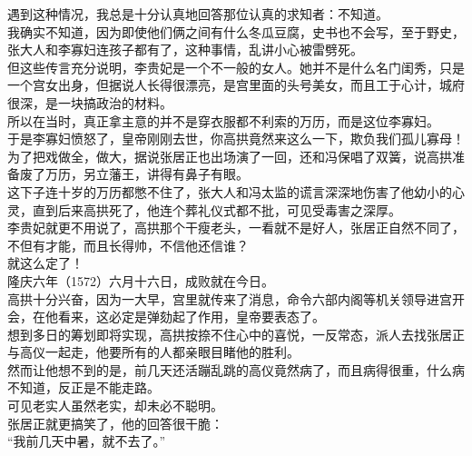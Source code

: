 \begin{multicols}{\theparacolNo}
遇到这种情况，我总是十分认真地回答那位认真的求知者：不知道。\\

我确实不知道，因为即使他们俩之间有什么冬瓜豆腐，史书也不会写，至于野史，张大人和李寡妇连孩子都有了，这种事情，乱讲小心被雷劈死。\\

但这些传言充分说明，李贵妃是一个不一般的女人。她并不是什么名门闺秀，只是一个宫女出身，但据说人长得很漂亮，是宫里面的头号美女，而且工于心计，城府很深，是一块搞政治的材料。\\

所以在当时，真正拿主意的并不是穿衣服都不利索的万历，而是这位李寡妇。\\

于是李寡妇愤怒了，皇帝刚刚去世，你高拱竟然来这么一下，欺负我们孤儿寡母！\\

为了把戏做全，做大，据说张居正也出场演了一回，还和冯保唱了双簧，说高拱准备废了万历，另立藩王，讲得有鼻子有眼。\\

这下子连十岁的万历都憋不住了，张大人和冯太监的谎言深深地伤害了他幼小的心灵，直到后来高拱死了，他连个葬礼仪式都不批，可见受毒害之深厚。\\

李贵妃就更不用说了，高拱那个干瘦老头，一看就不是好人，张居正自然不同了，不但有才能，而且长得帅，不信他还信谁？\\

就这么定了！\\

隆庆六年（1572）六月十六日，成败就在今日。\\

高拱十分兴奋，因为一大早，宫里就传来了消息，命令六部内阁等机关领导进宫开会，在他看来，这必定是弹劾起了作用，皇帝要表态了。\\

想到多日的筹划即将实现，高拱按捺不住心中的喜悦，一反常态，派人去找张居正与高仪一起走，他要所有的人都亲眼目睹他的胜利。\\

然而让他想不到的是，前几天还活蹦乱跳的高仪竟然病了，而且病得很重，什么病不知道，反正是不能走路。\\

可见老实人虽然老实，却未必不聪明。\\

张居正就更搞笑了，他的回答很干脆：\\

“我前几天中暑，就不去了。”\\


\end{multicols}
